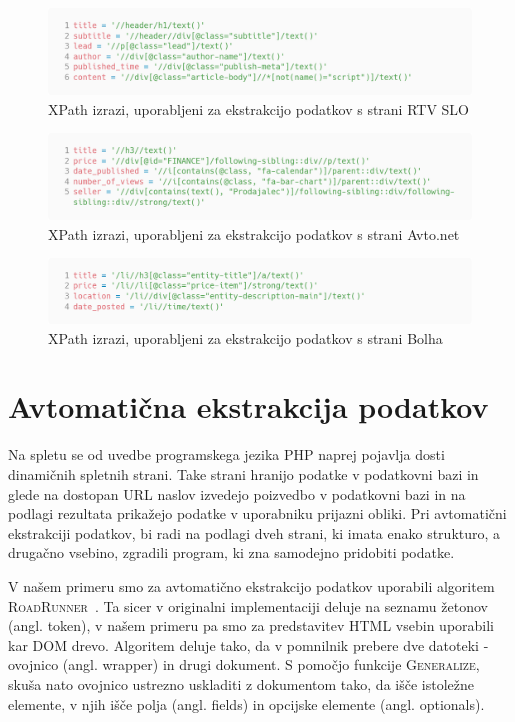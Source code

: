 \documentclass[conference]{IEEEtran}
\begin{document}
	\begin{figure}
		\centering
		\includegraphics[width=0.9\linewidth]{images/rtvslo_xpath}
		\caption{XPath izrazi, uporabljeni za ekstrakcijo podatkov s strani RTV SLO}
		\label{fig:rtvslo-xpath}
	\end{figure}

	\begin{figure}
		\centering
		\includegraphics[width=0.9\linewidth]{images/avtonet_xpath}
		\caption{XPath izrazi, uporabljeni za ekstrakcijo podatkov s strani Avto.net}
		\label{fig:avtonet-xpath}
	\end{figure}

	\begin{figure}
		\centering
		\includegraphics[width=0.9\linewidth]{images/bolha_xpath}
		\caption{XPath izrazi, uporabljeni za ekstrakcijo podatkov s strani Bolha}
		\label{fig:bolha-xpath}
	\end{figure}
	
	\section{Avtomatična ekstrakcija podatkov}
	
	Na spletu se od uvedbe programskega jezika PHP naprej pojavlja dosti dinamičnih spletnih strani. Take strani hranijo podatke v podatkovni bazi in glede na dostopan URL naslov izvedejo poizvedbo v podatkovni bazi in na podlagi rezultata prikažejo podatke v uporabniku prijazni obliki. Pri avtomatični ekstrakciji podatkov, bi radi na podlagi dveh strani, ki imata enako strukturo, a drugačno vsebino, zgradili program, ki zna samodejno pridobiti podatke.
	
	V našem primeru smo za avtomatično ekstrakcijo podatkov uporabili algoritem \textsc{RoadRunner}~\cite{roadrunner, crescenzi2001automatic}. Ta sicer v originalni implementaciji deluje na seznamu žetonov (angl. token), v našem primeru pa smo za predstavitev HTML vsebin uporabili kar DOM drevo. Algoritem deluje tako, da v pomnilnik prebere dve datoteki - ovojnico (angl. wrapper) in drugi dokument. S pomočjo funkcije \textsc{Generalize}, skuša nato ovojnico ustrezno uskladiti z dokumentom tako, da išče istoležne elemente, v njih išče polja (angl. fields) in opcijske elemente (angl. optionals).
	
\end{document}
